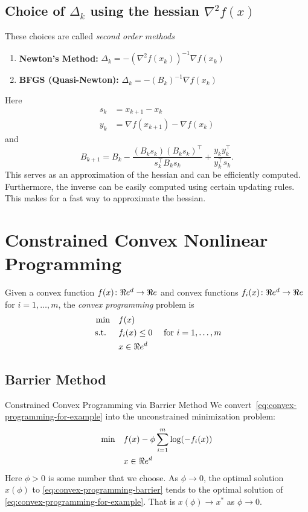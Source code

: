 \subsection{Choice of $\Delta_k$ using the hessian $\nabla^2 f(x)$}
These choices are called \emph{second order methods}
\begin{enumerate}
\item \textbf{Newton's Method:}   $\Delta_k = - (\nabla^2f(x_k))^{-1} \nabla f(x_k)$
\item \textbf{BFGS (Quasi-Newton):} $\Delta_k = - (B_k)^{-1} \nabla f(x_k)$
\end{enumerate}
Here
\begin{align*}
s_k &= x_{k+1} - x_k\\
y_k &= \nabla f(x_{k+1}) - \nabla f(x_k)
\end{align*}
and
$$
B_{k+1} = B_k - \frac{(B_k s_k)(B_k s_k)^\top}{s_k^\top B_k s_k} + \frac{y_k y_k^\top}{y_k^\top s_k}.
$$
This serves as an approximation of the hessian and can be efficiently computed.  Furthermore,  the inverse can be easily computed using certain updating rules.  This makes for a fast way to approximate the hessian.



\section{Constrained Convex Nonlinear Programming}
Given a convex function $f(x)\colon \Re e^d \to \Re e$ and convex functions $f_i(x)\colon \Re e^d \to \Re e$ for $i=1, \dots, m$,  the \emph{convex programming} problem is
\begin{equation}
\label{eq:convex-programming-for-example}
\begin{split}
\min \quad & f(x)\\
\mbox{ s.t. }  \quad & f_i(x) \leq 0  \quad  \mbox{ for } i=1, \dots, m\\
& x \in \Re e^d
\end{split}
\end{equation}

\subsection{Barrier Method}
\begin{general}{Constrained Convex Programming via Barrier Method}{}
We convert~\ref{eq:convex-programming-for-example} into the unconstrained minimization problem:
\begin{equation}
\label{eq:convex-programming-barrier}
\begin{split}
\min \quad & f(x) - \phi \sum_{i=1}^m \log(-f_i(x)) \\
& x \in \Re e^d
\end{split}
\end{equation}
Here $\phi > 0$ is some number that we choose.  As $\phi \to 0$, the optimal solution $x(\phi)$ to \eqref{eq:convex-programming-barrier} tends to the optimal solution of \eqref{eq:convex-programming-for-example}.  That is $x(\phi) \to x^*$ as $\phi \to 0$.
\end{general}

